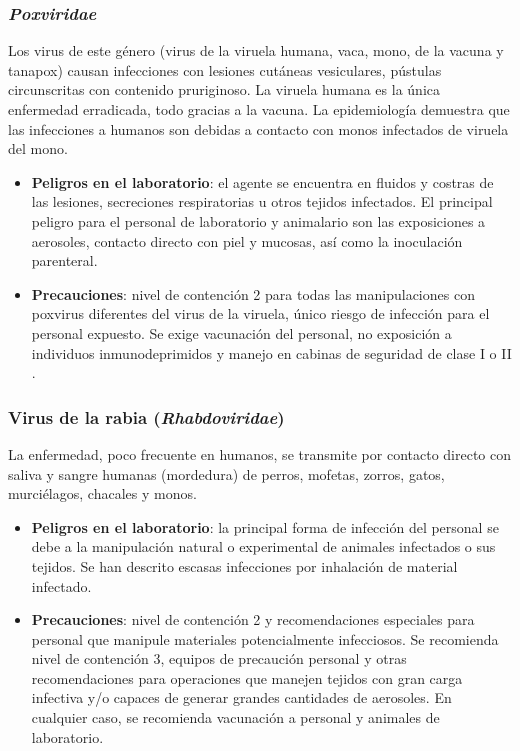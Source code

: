 \subsubsection{\textit{Poxviridae}}
Los virus de este género (virus de la viruela humana, vaca, mono, de la vacuna y tanapox) causan infecciones con lesiones cutáneas vesiculares, pústulas circunscritas con contenido pruriginoso. La viruela humana es la única enfermedad erradicada, todo gracias a la vacuna. La epidemiología demuestra que las infecciones a humanos son debidas a contacto con monos infectados de viruela del mono.
\begin{itemize}[itemsep=0pt,parsep=0pt,topsep=0pt,partopsep=0pt]
    \item \textbf{Peligros en el laboratorio}: el agente se encuentra en fluidos y costras de las lesiones, secreciones respiratorias u otros tejidos infectados. El principal peligro para el personal de laboratorio y animalario son las exposiciones a aerosoles, contacto directo con piel y mucosas, así como la inoculación parenteral.
    \item \textbf{Precauciones}:  nivel de contención 2 para todas las manipulaciones con poxvirus diferentes del virus de la viruela, único riesgo de infección para el personal expuesto. Se exige vacunación del personal, no exposición a individuos inmunodeprimidos y manejo en cabinas de seguridad de clase I o II .
\end{itemize}
\subsubsection{Virus de la rabia (\textit{Rhabdoviridae})}
La enfermedad, poco frecuente en humanos, se transmite por contacto directo con saliva y sangre humanas (mordedura) de perros, mofetas, zorros, gatos, murciélagos, chacales y monos.
\begin{itemize}[itemsep=0pt,parsep=0pt,topsep=0pt,partopsep=0pt]
    \item \textbf{Peligros en el laboratorio}: la principal forma de infección del personal se debe a la manipulación natural o experimental de animales infectados o sus tejidos. Se han descrito escasas infecciones por inhalación de material infectado.
    \item \textbf{Precauciones}:  nivel de contención 2 y recomendaciones especiales para personal que manipule materiales potencialmente infecciosos. Se recomienda nivel de contención 3, equipos de precaución personal y otras recomendaciones para operaciones que manejen tejidos con gran carga infectiva y/o capaces de generar grandes cantidades de aerosoles. En cualquier caso, se recomienda vacunación a personal y animales de laboratorio.
\end{itemize}
